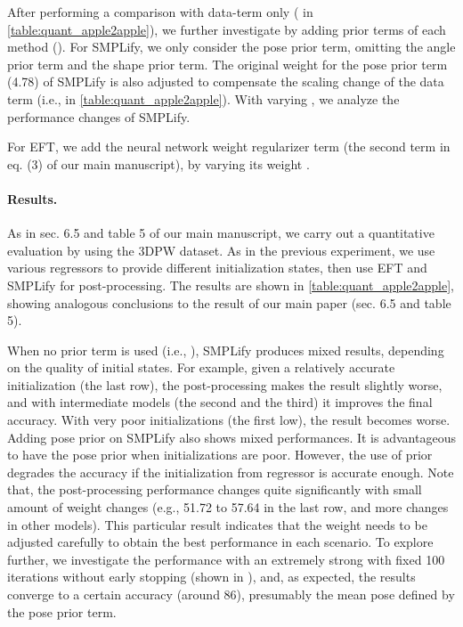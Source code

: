 \documentclass[10pt,twocolumn,letterpaper]{article}
\begin{document}
	After performing a comparison with data-term only ( in \cref{table:quant_apple2apple}), we further investigate by adding prior terms of each method (). For SMPLify, we only consider the pose prior term, omitting the angle prior term and the shape prior term. The original weight for the pose prior term (4.78) of SMPLify is also adjusted to compensate the scaling change of the data term (i.e.,  in \cref{table:quant_apple2apple}). With varying , we analyze the performance changes of SMPLify.
	
	For EFT, we add the neural network weight regularizer term (the second term in eq. (3) of our main manuscript), by varying its weight .  
	




	\paragraph{Results.}
	As in sec. 6.5 and table 5 of our main manuscript, we carry out a quantitative evaluation by using the 3DPW dataset. As in the previous experiment, we use various regressors  to provide different initialization states, then use EFT and SMPLify for post-processing. 
The results are shown in \cref{table:quant_apple2apple}, showing analogous conclusions to the result of our main paper (sec. 6.5 and table 5). 
	
	
	When no prior term is used (i.e., ), SMPLify produces mixed results, depending on the quality of initial states. For example, given a relatively accurate initialization (the last row), the post-processing makes the result slightly worse, and with intermediate models (the second and the third) it improves the final accuracy. With very poor initializations (the first low), the result becomes worse. 
Adding pose prior on SMPLify also shows mixed performances. It is advantageous to have the pose prior when initializations are poor.  However, the use of prior degrades the accuracy if the initialization from regressor is accurate enough. 
	Note that, the post-processing performance changes quite significantly with small amount of weight changes (e.g., 51.72 to 57.64 in the last row, and more changes in other models). This particular result indicates that the weight  needs to be adjusted carefully to obtain the best performance in each scenario. 
To explore further, we investigate the performance with an extremely strong  with fixed 100 iterations without early stopping (shown in ), and, as expected, the results converge to a certain accuracy (around 86), presumably the mean pose defined by the pose prior term.
	
\end{document}

